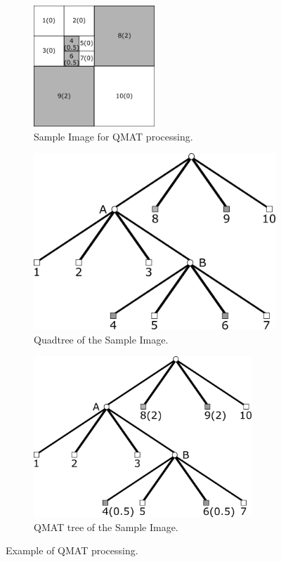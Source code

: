 \begin{figure}
\centering
\begin{subfigure}{\textwidth}
\centering
\includegraphics[width=0.5\textwidth]{qmat_picture}
\caption{Sample Image for QMAT processing.}
\end{subfigure}
\vspace{10px}

\begin{subfigure}[t]{.48\textwidth}
 \centering
 \includegraphics[width=.9\linewidth]{quadtree}
  \caption{Quadtree of the Sample Image.}
\end{subfigure}%
\hfill%
\begin{subfigure}[t]{.48\textwidth}
 \centering
 \includegraphics[width=0.9\textwidth]{QMATtree}
 \caption{QMAT tree of the Sample Image.}
\end{subfigure}
\caption{Example of QMAT processing.}
\label{qmat}
\end{figure}


